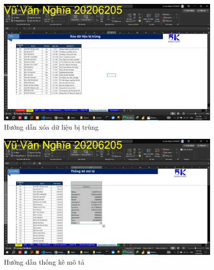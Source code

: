 \documentclass{article}
\begin{document}
\begin{figure}[H]
    \centering
    \includegraphics[scale = 0.15]{Video1/HuongDan/12.png}
    \caption{Hướng dẫn xóa dữ liệu bị trùng}
\end{figure}





\begin{figure}[H]
    \centering
    \includegraphics[scale = 0.15]{Video1/HuongDan/13.png}
    \caption{Hướng dẫn thống kê mô tả}
\end{figure}






\end{document}
